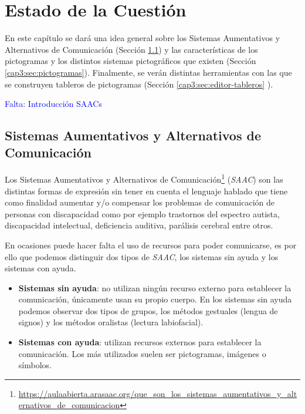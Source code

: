 \chapter{Estado de la Cuestión}
\label{cap:estadoDeLaCuestion}



\begin{resumen} En este capítulo se dará una idea general sobre los Sistemas Aumentativos y Alternativos de Comunicación (Sección \ref{cap3:sec:saac}) y las características de los pictogramas y los distintos sistemas pictográficos que existen (Sección \ref{cap3:sec:pictogramas}). Finalmente, se verán distintas herramientas con las que se construyen tableros de pictogramas (Sección \ref{cap3:sec:editor-tableros} ).

\end{resumen}

\textcolor{blue}{Falta: Introducción SAACs}

\section{Sistemas Aumentativos y Alternativos de Comunicación}
\label{cap3:sec:saac}
Los Sistemas Aumentativos y Alternativos de Comunicación\footnote{\url{https://aulaabierta.arasaac.org/que_son_los_sistemas_aumentativos_y_alternativos_de_comunicacion}} (\textit{SAAC}) son las distintas formas de expresión sin tener en cuenta el lenguaje hablado que tiene como finalidad aumentar y/o compensar los problemas de comunicación de personas con discapacidad como por ejemplo trastornos del espectro autista, discapacidad intelectual, deficiencia auditiva, parálisis cerebral entre otros.

En ocasiones puede hacer falta el uso de recursos para poder comunicarse, es por ello que podemos distinguir dos tipos de \textit{SAAC}, los sistemas sin ayuda y los sistemas con ayuda.

\begin{itemize}
	\item \textbf{Sistemas sin ayuda}: no utilizan ningún recurso externo para establecer la comunicación, únicamente usan su propio cuerpo. En los sistemas sin ayuda podemos observar dos tipos de grupos, los métodos gestuales (lengua de signos) y los métodos oralistas (lectura labiofacial). 
	\item \textbf{Sistemas con ayuda}: utilizan recursos externos para establecer la comunicación. Los más utilizados suelen ser pictogramas, imágenes o símbolos.
\end{itemize}

